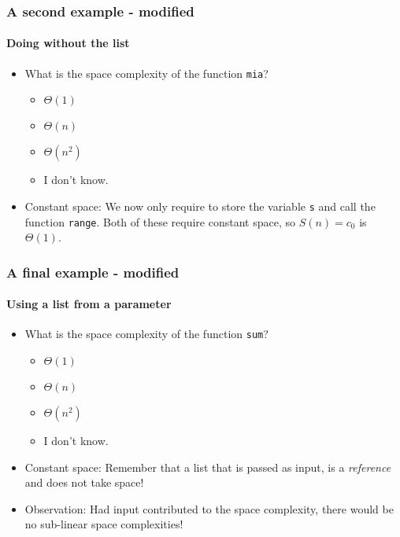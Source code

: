 \begin{frame}
	\frametitle{A second example - modified}
	\framesubtitle{Doing without the list}
			\begin{itemize}
				\item What is the space complexity of the function \texttt{mia}?
			\begin{itemize}
				\item $\Theta(1)$
				\item $\Theta(n)$ 
				\item $\Theta(n^2)$
				\item I don't know.
			\end{itemize}
	
				\item Constant space:
		We now only require to store the variable \texttt{s} and call the function \texttt{range}. Both of these require
		constant space, so $S(n) = c_0$ is $\Theta(1)$.
	\end{itemize}
	
			

\end{frame}

\begin{frame}
	\frametitle{A final example - modified}
	\framesubtitle{Using a list from a parameter}
						\begin{itemize}
				\item What is the space complexity of the function \texttt{sum}?
			\begin{itemize}
				\item $\Theta(1)$
				\item $\Theta(n)$ 
				\item $\Theta(n^2)$
				\item I don't know.
			\end{itemize}
				\item Constant space:
		Remember that a list that is passed as input, is a \textit{reference} and does not take space!
				\item Observation:
			Had input contributed to the space complexity, there would be no sub-linear space complexities!	
		\end{itemize}	
		
				

\end{frame}


